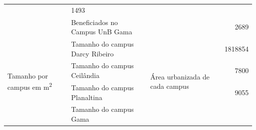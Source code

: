 \begin{table}
\begin{tabular}{p{}p{}p{}r}
                                                                                                                      &
        \num{1493}                                                                                                      \\
                                                                                                                      &
        Beneficiados no Campus UnB Gama                                                                               &
                                                                                                                      &
        \num{2689}                                                                                                      \\
        \midrule
        \multirow[t]{4}{0.23\textwidth}{Tamanho por campus em \unit{\meter\squared}}                                  &
        Tamanho do campus Darcy Ribeiro                                                                               &
        \multirow[t]{4}{0.25\textwidth}{Área urbanizada de cada campus~\cite{estatistica2020}}                        &
        \num{1818854}                                                                                                   \\
                                                                                                                      &
        Tamanho do campus Ceilândia                                                                                   &
                                                                                                                      &
        \num{7800}                                                                                                      \\
                                                                                                                      &
        Tamanho do campus Planaltina                                                                                  &
                                                                                                                      &
        \num{9055}                                                                                                      \\
                                                                                                                      &
        Tamanho do campus Gama                                                                                        &

\end{tabular}
\end{table}

